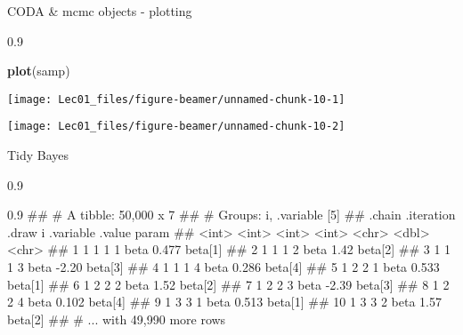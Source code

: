 \documentclass[11pt,ignorenonframetext,]{beamer}
\newenvironment{Shaded}{}{}
\newcommand{\DataTypeTok}[1]{\textcolor[rgb]{0.56,0.13,0.00}{#1}}
\newcommand{\KeywordTok}[1]{\textcolor[rgb]{0.00,0.44,0.13}{\textbf{#1}}}
\newcommand{\NormalTok}[1]{#1}
\newcommand{\OperatorTok}[1]{\textcolor[rgb]{0.40,0.40,0.40}{#1}}
\newcommand{\StringTok}[1]{\textcolor[rgb]{0.25,0.44,0.63}{#1}}
\let\oldShaded\Shaded
\let\endoldShaded\endShaded
\renewenvironment{Shaded}{\footnotesize\begin{spacing}{0.9}\oldShaded}{\endoldShaded\end{spacing}}
\let\oldverbatim\verbatim
\let\endoldverbatim\endverbatim
\renewenvironment{verbatim}{\footnotesize\begin{spacing}{0.9}\oldverbatim}{\endoldverbatim\end{spacing}}
\begin{document}
\begin{frame}[fragile,t]{CODA \& mcmc objects - plotting}
\protect\hypertarget{coda-mcmc-objects---plotting}{}

\begin{Shaded}
\begin{Highlighting}[]
\KeywordTok{plot}\NormalTok{(samp)}
\end{Highlighting}
\end{Shaded}

\begin{center}\texttt{[image: Lec01\_files/figure-beamer/unnamed-chunk-10-1]} \end{center}

\begin{center}\texttt{[image: Lec01\_files/figure-beamer/unnamed-chunk-10-2]} \end{center}

\end{frame}

\begin{frame}[fragile,t]{Tidy Bayes}
\protect\hypertarget{tidy-bayes}{}

\begin{Shaded}
\end{Shaded}

\begin{verbatim}
## # A tibble: 50,000 x 7
## # Groups:   i, .variable [5]
##    .chain .iteration .draw     i .variable .value param  
##     <int>      <int> <int> <int> <chr>      <dbl> <chr>  
##  1      1          1     1     1 beta       0.477 beta[1]
##  2      1          1     1     2 beta       1.42  beta[2]
##  3      1          1     1     3 beta      -2.20  beta[3]
##  4      1          1     1     4 beta       0.286 beta[4]
##  5      1          2     2     1 beta       0.533 beta[1]
##  6      1          2     2     2 beta       1.52  beta[2]
##  7      1          2     2     3 beta      -2.39  beta[3]
##  8      1          2     2     4 beta       0.102 beta[4]
##  9      1          3     3     1 beta       0.513 beta[1]
## 10      1          3     3     2 beta       1.57  beta[2]
## # ... with 49,990 more rows
\end{verbatim}

\end{frame}
\end{document}
